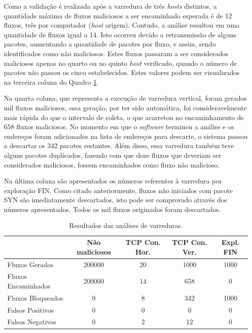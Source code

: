 Como a validação é realizada após a varredura de três \textit{hosts} distintos, a quantidade máxima de fluxos maliciosos a ser encaminhado esperada é de 12 fluxos, três por computador (\textit{host} origem). Contudo, a análise resultou em uma quantidade de fluxos igual a 14. Isto ocorreu devido a retransmissão de alguns pacotes, aumentando a quantidade de pacotes por fluxo, e assim, sendo identificados como não maliciosos. Estes fluxos passaram a ser considerados maliciosos apenas no quarto ou no quinto \textit{host} verificado, quando o número de pacotes não passou os cinco estabelecidos. Estes valores podem ser visualizados na terceira coluna do Quadro \ref{fig:e1}.

Na quarta coluna, que representa a execução de varredura vertical, foram gerados mil fluxos maliciosos, essa geração, por ter sido automática, foi consideravelmente mais rápida do que o intervalo de coleta, o que acarretou no encaminhamento de 658 fluxos maliciosos. No momento em que o \textit{software} terminou a análise e os endereços foram adicionados na lista de endereços para descarte, o sistema passou a descartar os 342 pacotes restantes. Além disso, essa varredura também teve alguns pacotes duplicados, fazendo com que doze fluxos que deveriam ser considerados maliciosos, fossem encaminhados como fluxo não malicioso.

Na última coluna são apresentados os números referentes à varredura por exploração FIN. Como citado anteriormente, fluxos não iniciados com pacote SYN são imediatamente descartados, isto pode ser comprovado através dos números apresentados. Todos os mil fluxos originados foram descartados.

\begin{table}[H]
\centering
\caption{Resultados das análises de varreduras.}
\label{fig:e1}
\begin{tabular}{|l|c|c|c|c|}
\hline
\multicolumn{1}{|c|}{} & Não maliciosos & TCP Con. Hor. & TCP Con. Ver. & Expl. FIN \\ \hline
Fluxos Gerados         & 200000          & 20      & 1000     & 1000     \\ \hline
Fluxos Encaminhados    & 200000          & 14      & 658      & 0        \\ \hline
Fluxos Bloqueados      & 0              & 8       & 342      & 1000     \\ \hline
Falsos Positivos       & 0              & 0       & 0        & 0        \\ \hline
Falsos Negativos       & 0              & 2       & 12       & 0        \\ \hline
\end{tabular}
\end{table}

